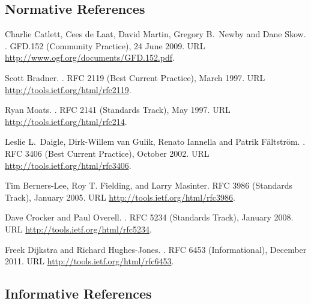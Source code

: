 \documentclass[12pt]{article}  %
\begin{document}
\subsection*{Normative References}
\begin{thebibliography}{10}
\vspace*{-3em}

Charlie Catlett, Cees de Laat, David Martin, Gregory B.\ Newby and Dane Skow.
.
\newblock GFD.152 (Community Practice), 24 June 2009.
\newblock URL \url{http://www.ogf.org/documents/GFD.152.pdf}.

Scott Bradner.
.
\newblock RFC 2119 (Best Current Practice), March 1997.
\newblock URL \url{http://tools.ietf.org/html/rfc2119}.

Ryan Moats.
.
\newblock RFC 2141 (Standards Track), May 1997.
\newblock URL \url{http://tools.ietf.org/html/rfc214}.

Leslie L.\ Daigle, Dirk-Willem van Gulik, Renato Iannella and Patrik Fältström.
.
\newblock RFC 3406 (Best Current Practice), October 2002.
\newblock URL \url{http://tools.ietf.org/html/rfc3406}.

Tim Berners-Lee, Roy T. Fielding, and Larry Masinter.
\newblock RFC 3986 (Standards Track), January 2005.
\newblock URL \url{http://tools.ietf.org/html/rfc3986}.

Dave Crocker and Paul Overell.
.
\newblock RFC 5234 (Standards Track), January 2008.
\newblock URL \url{http://tools.ietf.org/html/rfc5234}.

Freek Dijkstra and Richard Hughes-Jones.
.
\newblock RFC 6453 (Informational), December 2011.
\newblock URL \url{http://tools.ietf.org/html/rfc6453}.

\end{thebibliography}

\subsection*{Informative References}
\end{document}
